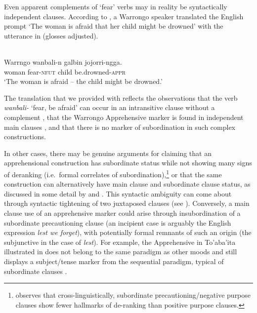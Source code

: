 \documentclass[output=paper,colorlinks,citecolor=brown
]{langscibook}
\begin{document}
 Even apparent complements of `fear' verbs may in reality be syntactically independent clauses. According to \citet[619]{tsunoda2011}, a Warrongo speaker translated the English prompt `The woman is afraid that her child might be drowned' with the utterance in  (glosses adjusted). 

\ea \label{ex:intro10} 
\\
\gll Warrngo wanbali-n	galbin jojorri-ngga. \\
woman fear-\textsc{nfut} child be.drowned-\textsc{appr} \\
\glt `The woman is afraid -- the child might be drowned.'
\z

\noindent The translation that we provided with  reflects the observations that the verb \textit{wanbali-} `fear, be afraid' can occur in an intransitive clause without a complement \citep[401]{tsunoda2011}, that the Warrongo Apprehensive marker is found in independent main clauses \citep[286--287]{tsunoda2011}, and that there is no marker of subordination in such complex constructions. 


In other cases, there may be genuine arguments for claiming that an apprehensional construction has subordinate status while not showing many signs of deranking (i.e.\ formal correlates of subordination),\footnote{\citet[439]{schmidtkebode2012} observes that cross-linguistically, subordinate precautioning/negative purpose clauses show fewer hallmarks of de-ranking than positive purpose clauses.} or that the same construction can alternatively have main clause and subordinate clause status, as discussed in some detail by \citet{lichtenberk1995} and \citet{Dobrushina2006}. This syntactic ambiguity can come about through syntactic tightening of two juxtaposed clauses (see \citealt{chapters/wiemer}). Conversely, a main clause use of an apprehensive marker could arise through insubordination of a subordinate precautioning clause (an incipient case is arguably the English expression \textit{lest we forget}), with potentially formal remnants of such an origin (the subjunctive in the case of \textit{lest}). For example, the Apprehensive in To'aba'ita illustrated in  does not belong to the same paradigm as other moods and still displays a subject/tense marker from the sequential paradigm, typical of subordinate clauses \citep[296]{lichtenberk1995}. 
\end{document}
